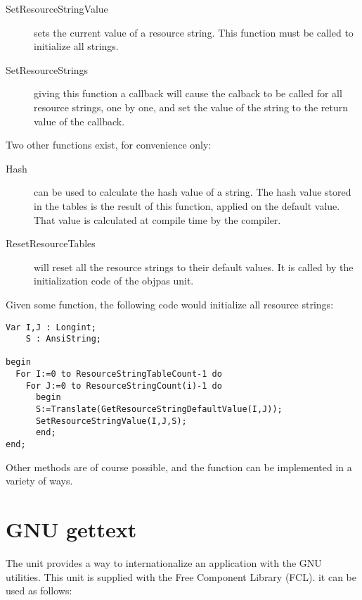 {\begin{description}
\item[SetResourceStringValue] sets the current value of a resource string.
This function must be called to initialize all strings.
\item[SetResourceStrings] giving this function a callback will cause the
calback to be called for all resource strings, one by one, and set the value
of the string to the return value of the callback.
\end{description}
Two other functions exist, for convenience only:
\begin{description}
\item [Hash] can be used to calculate the hash value of a string. The hash
value stored in the tables is the result of this function, applied on the
default value. That value is calculated at compile time by the compiler.
\item[ResetResourceTables] will reset all the resource strings to their
default values. It is called by the initialization code of the objpas unit.
\end{description}

Given some  function, the following code would initialize
all resource strings:
\begin{verbatim}
Var I,J : Longint;
    S : AnsiString;

begin
  For I:=0 to ResourceStringTableCount-1 do
    For J:=0 to ResourceStringCount(i)-1 do
      begin
      S:=Translate(GetResourceStringDefaultValue(I,J));
      SetResourceStringValue(I,J,S);
      end;
end;
\end{verbatim}
Other methods are of course possible, and the  function
can be implemented in a variety of ways.
\section{GNU gettext}
The unit  provides a way to internationalize an application
with the GNU  utilities. This unit is supplied with  the
Free Component Library (FCL). it can be used as follows:

}
